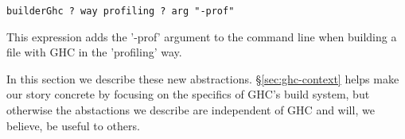 \begin{lstlisting}
builderGhc ? way profiling ? arg "-prof"
\end{lstlisting}

\noindent This expression adds the \lst'-prof' argument to the command line when
building a file with GHC in the \lst'profiling' way.

In this section we describe these new abstractions. \S\ref{sec:ghc-context} helps
make our story concrete by focusing on the specifics of GHC's build system,
but otherwise the abstactions we describe are independent of GHC and will, we believe,
be useful to others.

\newcommand{\itab}[1]{\hspace{0em}\rlap{#1}}
\newcommand{\tab}[1]{\hspace{.1\textwidth}\rlap{#1}}
\newcommand{\ctab}[1]{\hspace{.031\textwidth}\rlap{#1}}
\newcommand{\ptab}[1]{\hspace{.074\textwidth}\rlap{#1}}
\newcommand{\cotab}[1]{\hspace{.064\textwidth}\rlap{#1}}
\newcommand{\ttab}[1]{\hspace{.058\textwidth}\rlap{#1}}
\newcommand{\tytab}[1]{\hspace{.06\textwidth}\rlap{#1}}
\newcommand{\atab}[1]{\hspace{.102\textwidth}\rlap{#1}}

